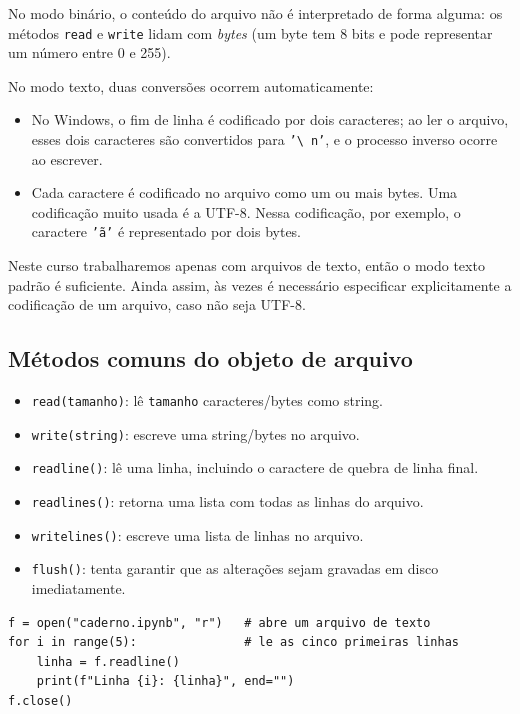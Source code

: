 \documentclass[11pt,a4paper]{article}
\begin{document}
No modo binário, o conteúdo do arquivo não é interpretado de forma
alguma: os métodos \texttt{read} e \texttt{write} lidam com \emph{bytes}
(um byte tem 8 bits e pode representar um número entre 0 e 255).

No modo texto, duas conversões ocorrem automaticamente:

\begin{itemize}
\item No Windows, o fim de linha é codificado por dois caracteres; ao ler
  o arquivo, esses dois caracteres são convertidos para \texttt{'\textbackslash
  n'}, e o processo inverso ocorre ao escrever.
\item Cada caractere é codificado no arquivo como um ou mais bytes. Uma
  codificação muito usada é a UTF-8. Nessa codificação, por exemplo, o
  caractere \texttt{'ã'} é representado por dois bytes.
\end{itemize}

Neste curso trabalharemos apenas com arquivos de texto, então o modo
texto padrão é suficiente. Ainda assim, às vezes é necessário especificar
explicitamente a codificação de um arquivo, caso não seja UTF-8.

\subsection{Métodos comuns do objeto de arquivo}

\begin{itemize}
\item \texttt{read(tamanho)}: lê \texttt{tamanho} caracteres/bytes como string.
\item \texttt{write(string)}: escreve uma string/bytes no arquivo.
\item \texttt{readline()}: lê uma linha, incluindo o caractere de quebra de linha final.
\item \texttt{readlines()}: retorna uma lista com todas as linhas do arquivo.
\item \texttt{writelines()}: escreve uma lista de linhas no arquivo.
\item \texttt{flush()}: tenta garantir que as alterações sejam gravadas em disco imediatamente.
\end{itemize}

\begin{lstlisting}
f = open("caderno.ipynb", "r")   # abre um arquivo de texto
for i in range(5):               # le as cinco primeiras linhas
    linha = f.readline()
    print(f"Linha {i}: {linha}", end="")
f.close()
\end{lstlisting}
\end{document}
